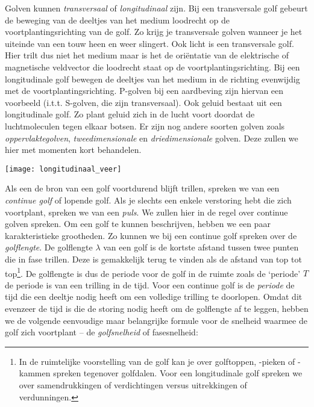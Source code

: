 \documentclass{ximera}
\begin{document}
	Golven kunnen \emph{transversaal} of \emph{longitudinaal} zijn. Bij een transversale golf gebeurt de beweging van de deeltjes van het medium loodrecht op de voortplantingsrichting van de golf. Zo krijg je transversale golven wanneer je het uiteinde van een touw heen en weer slingert. Ook licht is een transversale golf. Hier trilt dus niet het medium maar is het de ori\"entatie van de elektrische of magnetische veldvector die loodrecht staat op de voortplantingsrichting. Bij een longitudinale golf bewegen de deeltjes van het medium in de richting evenwijdig met de voortplantingsrichting. P-golven bij een aardbeving zijn hiervan een voorbeeld (i.t.t. S-golven, die zijn transversaal). Ook geluid bestaat uit een longitudinale golf. Zo plant geluid zich in de lucht voort doordat de luchtmoleculen tegen elkaar botsen. 
	Er zijn nog andere soorten golven zoals \emph{oppervlaktegolven}, \emph{tweedimensionale} en \emph{driedimensionale} golven. Deze zullen we hier met momenten kort behandelen.
	\begin{image}
	
	\texttt{[image: longitudinaal\_veer]}
	\end{image}
	Als een de bron van een golf voortdurend blijft trillen, spreken we van een \emph{continue golf} of lopende golf. Als je slechts een enkele verstoring hebt die zich voortplant, spreken we van een \emph{puls}. We zullen hier in de regel over continue golven spreken.
	Om een golf te kunnen beschrijven, hebben we een paar karakteristieke grootheden. Zo kunnen we bij een continue golf spreken over de \emph{golflengte}. De golflengte $\lambda$ van een golf is de kortste afstand tussen twee punten die in fase trillen. Deze is gemakkelijk terug te vinden als de afstand van top tot top\footnote{In de ruimtelijke voorstelling van de golf kan je over golftoppen, -pieken of -kammen spreken tegenover golfdalen. Voor een longitudinale golf spreken we over samendrukkingen of verdichtingen versus uitrekkingen of verdunningen.}. De golflengte is dus de periode voor de golf in de ruimte zoals de `periode' $T$ de periode is van een trilling in de tijd. Voor een continue golf is de \emph{periode} de tijd die een deeltje nodig heeft om een volledige trilling te doorlopen. Omdat dit evenzeer de tijd is die de storing nodig heeft om de golflengte af te leggen, hebben we de volgende eenvoudige maar belangrijke formule voor de snelheid waarmee de golf zich voortplant -- de \emph{golfsnelheid} of fasesnelheid:
\end{document}
